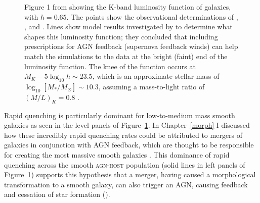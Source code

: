  \begin{figure}
\caption[Galaxy luminosity function from observations and simulations: Figure 1 of \cite{benson03}]{Figure 1 from \cite{benson03} showing the K-band luminosity function of galaxies, with $h=0.65$. The points show the observational determinations of \cite[][circles]{cole01}, \cite[][squares]{kochanek01}, and \cite[][$z < 0.1$, stars]{huang03}. Lines show model results investigated by \cite{benson03} to determine what shapes this luminosity function; they concluded that including prescriptions for AGN feedback (supernova feedback winds) can help match the simulations to the data at the bright (faint) end of the luminosity function. The knee of the function occurs at $M_K -5\log_{10} h \sim 23.5$, which is an approximate stellar mass of $\log_{10}[M_*/M_{\odot}] \sim 10.3$, assuming a mass-to-light ratio of $(M/L)_K = 0.8$ \citep{brinchmann00}.}
\label{rate}
\end{figure}
 
Rapid quenching is particularly dominant for low-to-medium mass smooth galaxies as seen in the level panels of Figure~\ref{rate}. In Chapter~\ref{morph} I discussed how these incredibly rapid quenching rates could be attributed to mergers of galaxies in conjunction with AGN feedback, which are thought to be responsible for creating the most massive smooth galaxies \citep{conselice03b, springel05b, hopkins08b}. This dominance of rapid quenching across the smooth \textsc{agn-host} population (solid lines in left panels of Figure~\ref{rate}) supports this hypothesis that a merger, having caused a morphological transformation to a smooth galaxy, can also trigger an AGN, causing feedback and cessation of star formation (\citealt{Sanders88, pontzen16}).

